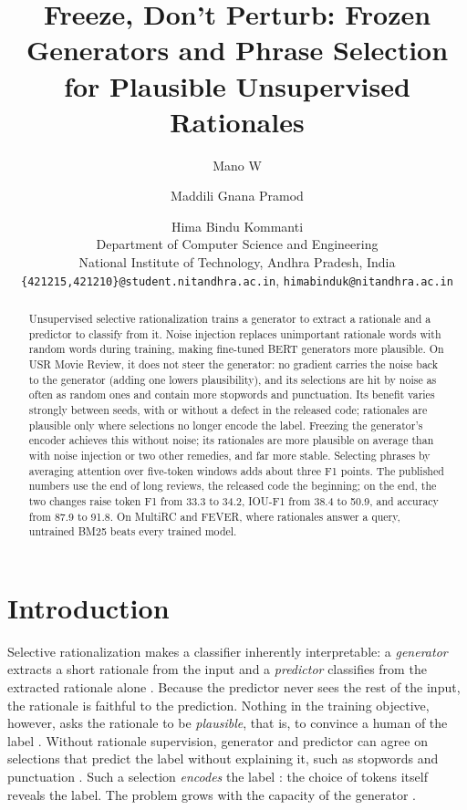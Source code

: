 \documentclass[11pt]{article}
\title{Freeze, Don't Perturb: Frozen Generators and Phrase Selection\\for Plausible Unsupervised Rationales}
\author{Mano W \and Maddili Gnana Pramod \and Hima Bindu Kommanti \\
  Department of Computer Science and Engineering \\
  National Institute of Technology, Andhra Pradesh, India \\
  \texttt{\{421215,421210\}@student.nitandhra.ac.in}, \texttt{himabinduk@nitandhra.ac.in}}
\begin{document}
\maketitle

\begin{abstract}
Unsupervised selective rationalization trains a generator to extract a rationale and a predictor to classify from it. Noise injection \citep{storek-etal-2023-unsupervised} replaces unimportant rationale words with random words during training, making fine-tuned BERT generators more plausible. On USR Movie Review, it does not steer the generator: no gradient carries the noise back to the generator (adding one lowers plausibility), and its selections are hit by noise as often as random ones and contain more stopwords and punctuation. Its benefit varies strongly between seeds, with or without a defect in the released code; rationales are plausible only where selections no longer encode the label. Freezing the generator's encoder achieves this without noise; its rationales are more plausible on average than with noise injection or two other remedies, and far more stable. Selecting phrases by averaging attention over five-token windows adds about three F1 points. The published numbers use the end of long reviews, the released code the beginning; on the end, the two changes raise token F1 from 33.3 to 34.2, IOU-F1 from 38.4 to 50.9, and accuracy from 87.9 to 91.8. On MultiRC and FEVER, where rationales answer a query, untrained BM25 beats every trained model.
\end{abstract}

\section{Introduction}

Selective rationalization makes a classifier inherently interpretable: a \emph{generator} extracts a short rationale from the input and a \emph{predictor} classifies from the extracted rationale alone \citep{lei-etal-2016-rationalizing}. Because the predictor never sees the rest of the input, the rationale is faithful to the prediction. Nothing in the training objective, however, asks the rationale to be \emph{plausible}, that is, to convince a human of the label \citep{jacovi-goldberg-2021-aligning}. Without rationale supervision, generator and predictor can agree on selections that predict the label without explaining it, such as stopwords and punctuation \citep{yu-etal-2019-rethinking}. Such a selection \emph{encodes} the label \citep{jethani-etal-2021-learned,puli-etal-2024-explanations}: the choice of tokens itself reveals the label. The problem grows with the capacity of the generator \citep{jacovi-goldberg-2021-aligning}.
\end{document}
